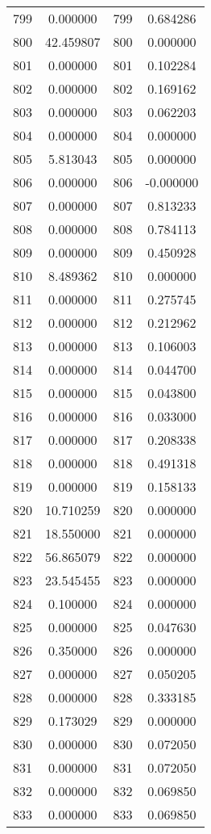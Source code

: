 \documentclass[12pt]{article}
\begin{document}
\begin{longtable}{@{}cccc@{}}
799 & 0.000000 & 799 & 0.684286 \\
800 & 42.459807 & 800 & 0.000000 \\
801 & 0.000000 & 801 & 0.102284 \\
802 & 0.000000 & 802 & 0.169162 \\
803 & 0.000000 & 803 & 0.062203 \\
804 & 0.000000 & 804 & 0.000000 \\
805 & 5.813043 & 805 & 0.000000 \\
806 & 0.000000 & 806 & -0.000000 \\
807 & 0.000000 & 807 & 0.813233 \\
808 & 0.000000 & 808 & 0.784113 \\
809 & 0.000000 & 809 & 0.450928 \\
810 & 8.489362 & 810 & 0.000000 \\
811 & 0.000000 & 811 & 0.275745 \\
812 & 0.000000 & 812 & 0.212962 \\
813 & 0.000000 & 813 & 0.106003 \\
814 & 0.000000 & 814 & 0.044700 \\
815 & 0.000000 & 815 & 0.043800 \\
816 & 0.000000 & 816 & 0.033000 \\
817 & 0.000000 & 817 & 0.208338 \\
818 & 0.000000 & 818 & 0.491318 \\
819 & 0.000000 & 819 & 0.158133 \\
820 & 10.710259 & 820 & 0.000000 \\
821 & 18.550000 & 821 & 0.000000 \\
822 & 56.865079 & 822 & 0.000000 \\
823 & 23.545455 & 823 & 0.000000 \\
824 & 0.100000 & 824 & 0.000000 \\
825 & 0.000000 & 825 & 0.047630 \\
826 & 0.350000 & 826 & 0.000000 \\
827 & 0.000000 & 827 & 0.050205 \\
828 & 0.000000 & 828 & 0.333185 \\
829 & 0.173029 & 829 & 0.000000 \\
830 & 0.000000 & 830 & 0.072050 \\
831 & 0.000000 & 831 & 0.072050 \\
832 & 0.000000 & 832 & 0.069850 \\
833 & 0.000000 & 833 & 0.069850 \\

\end{longtable}
\end{document}
